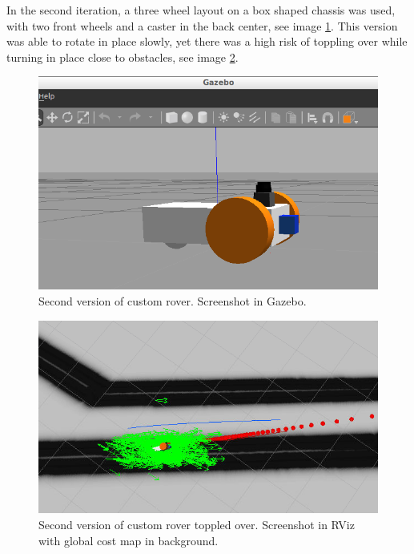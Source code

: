 \documentclass[10pt,journal,compsoc]{IEEEtran}
\begin{document}
In the second iteration, a three wheel layout on a box shaped chassis was used, with two front wheels and a caster in the back center, see image \ref{fig:rover_2_design}. This version was able to rotate in place slowly, yet there was a high risk of toppling over while turning in place close to obstacles, see image \ref{fig:rover_2_toppled}.
\begin{figure}[thpb]
      \centering
      \includegraphics[width=\columnwidth]{images/rover_version_2_gazebo.png}
      \caption{Second version of custom rover. Screenshot in Gazebo.}
      \label{fig:rover_2_design}
\end{figure}
\begin{figure}[thpb]
      \centering
      \includegraphics[width=\columnwidth]{images/rover_version_2_toppled_rviz.png}
      \caption{Second version of custom rover toppled over. Screenshot in RViz with global cost map in background.}
      \label{fig:rover_2_toppled}
\end{figure}
\end{document}
